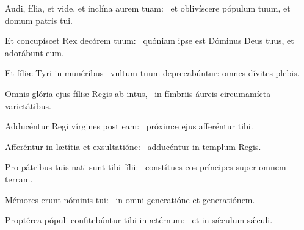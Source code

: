 
\item Audi, fília, et vide, et inclína aurem tuam:~\psstar{} et oblivíscere pópulum tuum, et domum patris tui.

\item Et concupíscet Rex decórem tuum:~\psstar{} quóniam ipse est Dóminus Deus tuus, et adorábunt eum.

\item Et fíliæ Tyri in munéribus~\psstar{} vultum tuum deprecabúntur: omnes dívites plebis.

\item Omnis glória ejus fíliæ Regis ab intus,~\psstar{} in fímbriis áureis circumamícta varietátibus.

\item Adducéntur Regi vírgines post eam:~\psstar{} próximæ ejus afferéntur tibi.

\item Afferéntur in lætítia et exsultatióne:~\psstar{} adducéntur in templum Regis.

\item Pro pátribus tuis nati sunt tibi fílii:~\psstar{} constítues eos príncipes super omnem terram.

\item Mémores erunt nóminis tui:~\psstar{} in omni generatióne et generatiónem.

\item Proptérea pópuli confitebúntur tibi in ætérnum:~\psstar{} et in sǽculum sǽculi.